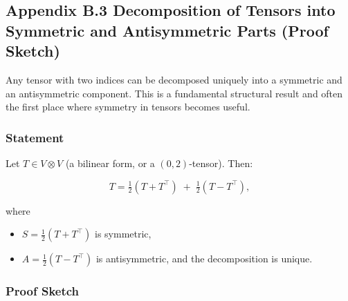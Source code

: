 \documentclass[
  letterpaper,
  DIV=11,
  numbers=noendperiod]{scrreprt}
\providecommand{\tightlist}{%
  \setlength{\itemsep}{0pt}\setlength{\parskip}{0pt}}
\begin{document}
\subsection{Appendix B.3 Decomposition of Tensors into Symmetric and
Antisymmetric Parts (Proof
Sketch)}\label{appendix-b.3-decomposition-of-tensors-into-symmetric-and-antisymmetric-parts-proof-sketch}

Any tensor with two indices can be decomposed uniquely into a symmetric
and an antisymmetric component. This is a fundamental structural result
and often the first place where symmetry in tensors becomes useful.

\subsubsection{Statement}\label{statement}

Let \(T \in V \otimes V\) (a bilinear form, or a \((0,2)\)-tensor).
Then:

\[
T = \tfrac{1}{2}(T + T^\top) \;+\; \tfrac{1}{2}(T - T^\top),
\]

where

\begin{itemize}
\tightlist
\item
  \(S = \tfrac{1}{2}(T + T^\top)\) is symmetric,
\item
  \(A = \tfrac{1}{2}(T - T^\top)\) is antisymmetric, and the
  decomposition is unique.
\end{itemize}

\subsubsection{Proof Sketch}\label{proof-sketch}
\end{document}
